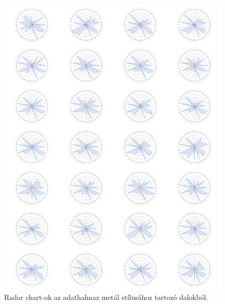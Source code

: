 \begin{figure}[p]
    \includegraphics{src/images/radar_metal.png}
    \caption{Radar chart-ok az adathalmaz metál stílusához tartozó dalokból.}
\end{figure}

